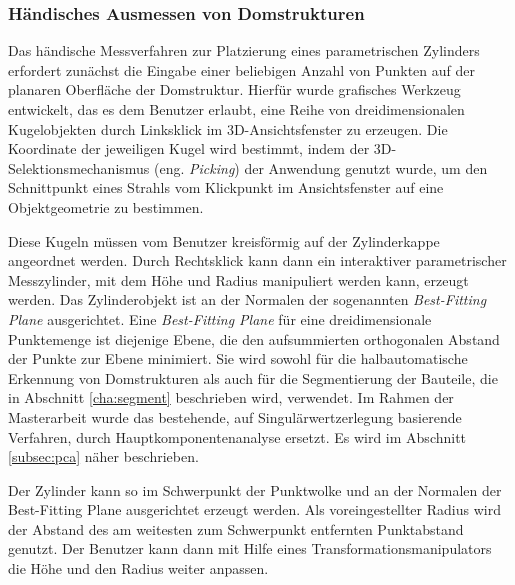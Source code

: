 \subsubsection{H\"andisches Ausmessen von Domstrukturen}
\label{domeMeasure}

Das h\"andische Messverfahren zur Platzierung eines parametrischen Zylinders erfordert zun\"achst die Eingabe einer beliebigen Anzahl von Punkten auf der planaren Oberfl\"ache der Domstruktur. Hierf\"ur wurde grafisches Werkzeug entwickelt, das es dem Benutzer erlaubt, eine Reihe von dreidimensionalen Kugelobjekten durch Linksklick im 3D-Ansichtsfenster zu erzeugen. Die Koordinate der jeweiligen Kugel wird bestimmt, indem der 3D-Selektionsmechanismus (eng. \textit{Picking}) der Anwendung genutzt wurde, um den Schnittpunkt eines Strahls vom Klickpunkt im Ansichtsfenster auf eine Objektgeometrie zu bestimmen.

Diese Kugeln m\"ussen vom Benutzer kreisf\"ormig auf der Zylinderkappe angeordnet werden. Durch Rechtsklick kann dann ein interaktiver parametrischer Messzylinder, mit dem H\"ohe und Radius manipuliert werden kann, erzeugt werden. Das Zylinderobjekt ist an der Normalen der sogenannten \textit{Best-Fitting Plane} ausgerichtet. Eine \textit{Best-Fitting Plane} f\"ur eine dreidimensionale Punktemenge ist diejenige Ebene, die den aufsummierten orthogonalen Abstand der Punkte zur Ebene minimiert. Sie wird sowohl f\"ur die halbautomatische Erkennung von Domstrukturen als auch f\"ur die Segmentierung der Bauteile, die in Abschnitt \ref{cha:segment} beschrieben wird, verwendet. Im Rahmen der Masterarbeit wurde das bestehende, auf Singulärwertzerlegung basierende Verfahren, durch Hauptkomponentenanalyse ersetzt. Es wird im Abschnitt \ref{subsec:pca} näher beschrieben.


Der Zylinder kann so im Schwerpunkt der Punktwolke und an der Normalen der Best-Fitting Plane ausgerichtet erzeugt werden. Als voreingestellter Radius wird der Abstand des am weitesten zum Schwerpunkt entfernten Punktabstand genutzt.
Der Benutzer kann dann mit Hilfe eines Transformationsmanipulators die Höhe und den Radius weiter anpassen.

